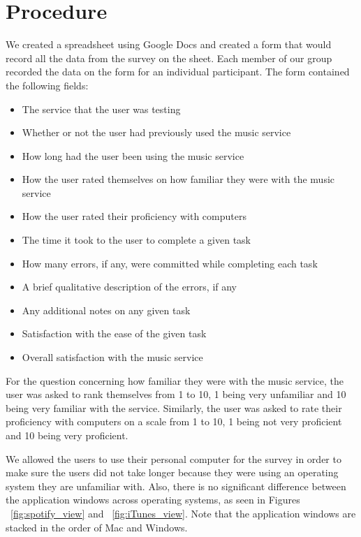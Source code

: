 \documentclass[11pt]{article}
\begin{document}
\section{Procedure}
We created a spreadsheet using Google Docs and created a form that would record all the data from the survey on the sheet. Each member of our group recorded the data on the form for an individual participant. The form contained the following fields:
\begin{itemize}
    \item The service that the user was testing 
    \item Whether or not the user had previously used the music service 
    \item How long had the user been using the music service 
    \item How the user rated themselves on how familiar they were with the music service
    \item How the user rated their proficiency with computers
    \item The time it took to the user to complete a given task
    \item How many errors, if any, were committed while completing each task
    \item A brief qualitative description of the errors, if any
    \item Any additional notes on any given task
    \item Satisfaction with the ease of the given task
    \item Overall satisfaction with the music service
\end{itemize}  
For the question concerning how familiar they were with the music service, the user was asked to rank themselves from 1 to 10, 1 being very unfamiliar and 10 being very familiar with the service. Similarly, the user was asked to rate their proficiency with computers on a scale from 1 to 10, 1 being not very proficient and 10 being very proficient.

We allowed the users to use their personal computer for the survey in order to make sure the users did not take longer because they were using an operating system they are unfamiliar with. Also, there is no significant difference between the application windows across operating systems, as seen in Figures ~\ref{fig:spotify_view} and ~\ref{fig:iTunes_view}. Note that the application windows are stacked in the order of Mac and Windows.
\end{document}
